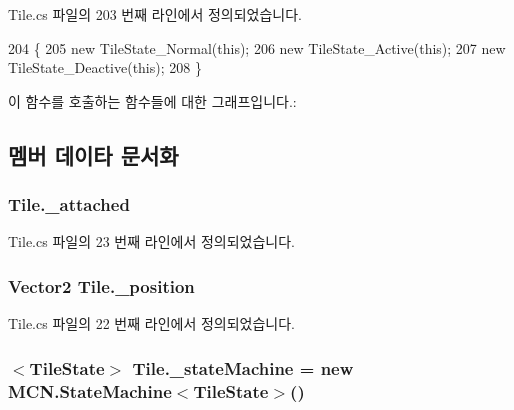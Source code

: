 Tile.\+cs 파일의 203 번째 라인에서 정의되었습니다.


\begin{DoxyCode}
204     \{
205         \textcolor{keyword}{new} TileState\_Normal(\textcolor{keyword}{this});
206         \textcolor{keyword}{new} TileState\_Active(\textcolor{keyword}{this});
207         \textcolor{keyword}{new} TileState\_Deactive(\textcolor{keyword}{this});
208     \}
\end{DoxyCode}


이 함수를 호출하는 함수들에 대한 그래프입니다.\+:




\subsection{멤버 데이타 문서화}
\subsubsection[{\texorpdfstring{\+\_\+attached}{_attached}}]{ Tile.\+\_\+attached\hspace{0.3cm}{\ttfamily [private]}}\hypertarget{class_tile_aa548ae60732f4d054b6777436baefdd5}{}\label{class_tile_aa548ae60732f4d054b6777436baefdd5}


Tile.\+cs 파일의 23 번째 라인에서 정의되었습니다.

\subsubsection[{\texorpdfstring{\+\_\+position}{_position}}]{\setlength{\rightskip}{0pt plus 5cm}Vector2 Tile.\+\_\+position\hspace{0.3cm}{\ttfamily [private]}}\hypertarget{class_tile_a56d02616cede51da0afdceff82ca958d}{}\label{class_tile_a56d02616cede51da0afdceff82ca958d}


Tile.\+cs 파일의 22 번째 라인에서 정의되었습니다.

\subsubsection[{\texorpdfstring{\+\_\+state\+Machine}{_stateMachine}}]{$<${\bf Tile\+State}$>$ Tile.\+\_\+state\+Machine = new {\bf M\+C\+N.\+State\+Machine}$<${\bf Tile\+State}$>$()\hspace{0.3cm}{\ttfamily [private]}}\hypertarget{class_tile_a822a1bffe56b1193b8c5c61070ea7827}{}\label{class_tile_a822a1bffe56b1193b8c5c61070ea7827}


